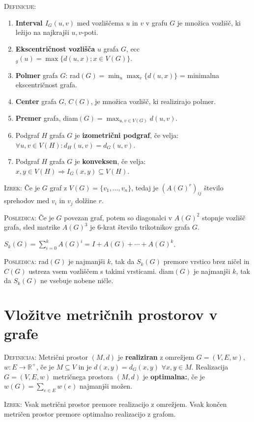 \documentclass[8pt,a4paper]{amsart}
\theoremstyle{definition} %
\theoremstyle{plain} %
\newcommand{\R}{\mathbb R}
\begin{document}
\textsc{Definicije:}
\begin{enumerate}
\item \textbf{Interval $I_G(u,v)$} med vozliščema $u$ in $v$ v grafu $G$ je množica vozlišč, ki ležijo na najkrajši $u,v$-poti.
\item \textbf{Ekscentričnost vozlišča} $u$ grafa $G$, ecc$_g(u) = \max{\{d(u,x);x \in V(G) \}}$.
\item \textbf{Polmer} grafa $G$: rad$(G) = \min_u{\max_v{\{ d(u,x)\}}}$ = minimalna ekscentričnost grafa.
\item \textbf{Center} grafa $G$, $C(G)$, je množica vozlišč, ki realizirajo polmer.
\item \textbf{Premer} grafa, diam$(G) = \max_{u,v \in V(G)}d(u,v)$.
\item Podgraf $H$ grafa $G$ je \textbf{izometrični podgraf}, če velja: $\forall u,v \in V(H): d_H(u,v) = d_G(u,v)$.
\item Podgraf $H$ grafa $G$ je \textbf{konveksen}, če velja: $x,y \in V(H) \Longrightarrow I_G(x,y) \subseteq V(H)$.
\end{enumerate}

\textsc{Izrek:} Če je $G$ graf z $V(G) = \{ v_1,\ldots ,v_n \}$, tedaj je
$(A(G)^r)_{ij}$ število sprehodov med $v_i$ in $v_j$ dolžine $r$.

\textsc{Posledica:} Če je $G$ povezan graf, potem so diagonalci v $A(G)^2$
stopnje vozlišč grafa, sled matrike $A(G)^3$ je 6-krat število trikotnikov grafa
$G$.

$S_k(G) = \sum_{i=0}^kA(G)^i = I + A(G) + \cdots + A(G)^k$.

\textsc{Posledica:} rad$(G) $ je najmanjši $k$, tak da $S_k(G)$ premore vrstico
brez ničel in $C(G)$ ustreza vsem vozliščem s takimi vrsticami. diam$(G)$ je
najmanjši $k$, tak da $S_k(G)$ ne vsebuje nobene ničle.

\vspace{-2ex}
\section{Vložitve metričnih prostorov v grafe}

\textsc{Definicija:} Metrični prostor $(M,d)$ je \textbf{realiziran} z omrežjem
$G = (V,E,w)$, $w:E\longrightarrow \R^+$, če je $M \subseteq V$ in je $d(x,y) =
d_G(x,y)$ $\forall x,y \in M$. Realizacija $G=(V,E,w)$ metričnega prostora
$(M,d)$ je \textbf{optimalna:}, če je $w(G) = \sum_{e \in E} w(e)$ najmanjši
možen.

\textsc{Izrek:} Vsak metrični prostor premore realizacijo z omrežjem. Vsak
končen metričen prostor premore optimalno realizacijo z grafom.
\end{document}
